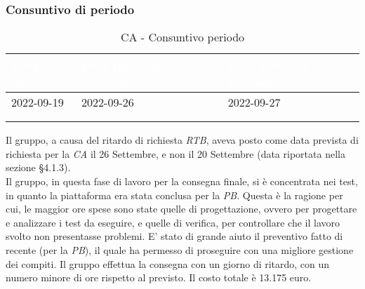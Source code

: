             \subsubsection{Consuntivo di periodo} {
                \setlength{\freewidth}{\dimexpr\textwidth-30\tabcolsep}
                \renewcommand{\arraystretch}{1.0}
                \setlength{\aboverulesep}{0pt}
                \setlength{\belowrulesep}{0pt}
                \begin{longtable}{C{.4\freewidth} C{.4\freewidth} C{.4\freewidth}}
                \toprule
                \textcolor{white}{\textbf{Data inizio}}&
                \textcolor{white}{\textbf{Data previsione revisione}}&
                \textcolor{white}{\textbf{Data richiesta revisione}} \\
                \toprule
                \endhead
                    
                2022-09-19 & 2022-09-26 & 2022-09-27 \\
                \\
                \caption{CA - Consuntivo periodo}
                \end{longtable}
            
            Il gruppo, a causa del ritardo di richiesta \textit{RTB}, aveva posto come data prevista di richiesta per la \textit{CA} il 26 Settembre, e non il 20 Settembre (data riportata nella sezione \S 4.1.3). \\
            Il gruppo, in questa fase di lavoro per la consegna finale, si è concentrata nei test, in quanto la piattaforma era stata conclusa per la \textit{PB}. Questa è la ragione per cui, le maggior ore spese sono state 
            quelle di progettazione, ovvero per progettare e analizzare i test da eseguire, e quelle di verifica, per controllare che il lavoro svolto non presentasse problemi. E' stato di grande aiuto il preventivo fatto di recente (per la \textit{PB}), il quale 
            ha permesso di proseguire con una migliore gestione dei compiti. Il gruppo effettua la consegna con un giorno di ritardo, con un numero minore di ore rispetto al previsto. Il costo totale è 13.175 euro. 
    }

